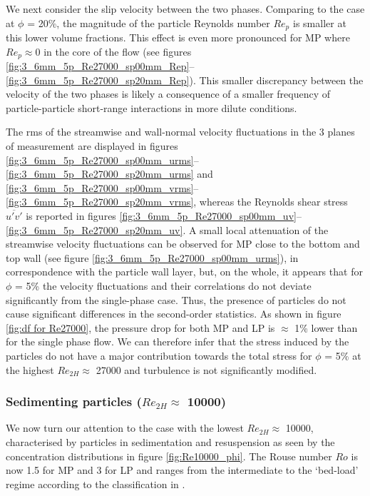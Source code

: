 \documentclass{jfm}
\begin{document}
We next consider the slip velocity between the two phases. Comparing to the case at $\phi$ = 20\%, the magnitude of the particle Reynolds number $Re_p$ is smaller at this lower volume fractions. This effect is even more pronounced for MP where $Re_p\approx$0 in the core of the flow (see figures \ref{fig:3_6mm_5p_Re27000_sp00mm_Rep}--\ref{fig:3_6mm_5p_Re27000_sp20mm_Rep}).
This smaller discrepancy between the velocity of the two phases is likely a consequence of a smaller frequency of particle-particle short-range interactions in more dilute conditions.



The rms of the streamwise and wall-normal velocity fluctuations in the 3 planes of measurement are displayed in 
figures \ref{fig:3_6mm_5p_Re27000_sp00mm_urms}--\ref{fig:3_6mm_5p_Re27000_sp20mm_urms} and \ref{fig:3_6mm_5p_Re27000_sp00mm_vrms}--\ref{fig:3_6mm_5p_Re27000_sp20mm_vrms}, whereas the  Reynolds shear stress $\overline{u'v'}$ is reported in figures \ref{fig:3_6mm_5p_Re27000_sp00mm_uv}--\ref{fig:3_6mm_5p_Re27000_sp20mm_uv}. 
A small local attenuation of the streamwise velocity fluctuations can be observed for MP close to the bottom and top wall (see figure \ref{fig:3_6mm_5p_Re27000_sp00mm_urms}), in correspondence with the particle wall layer, but, on the whole, it appears that for $\phi$ = 5\% the velocity fluctuations and their correlations do not deviate significantly from the single-phase case. Thus, the presence of particles do not cause significant differences in the second-order statistics. As shown in figure \ref{fig:df for Re27000}, the pressure drop for both MP and LP is $\approx$ 1\% lower than for the single phase flow. We can therefore infer that the stress induced by the particles do not have a major contribution towards the total stress for $\phi$ = 5\% at the highest $Re_{2H}\approx$ 27000 and turbulence is not significantly modified.



\subsubsection{Sedimenting particles ($Re_{2H}\approx$ 10000)}\label{sec:Velocity statistics: Sedimenting particles}




We now turn our attention to the case with the lowest $Re_{2H}\approx$ 10000, characterised by particles in sedimentation and resuspension as seen by the concentration distributions in figure \ref{fig:Re10000_phi}. The Rouse number $Ro$ is now 1.5 for MP and 3 for LP and ranges from the intermediate to the `bed-load' regime according to the classification in \cite{fredsoe1992mechanics}. 
\\
\end{document}
